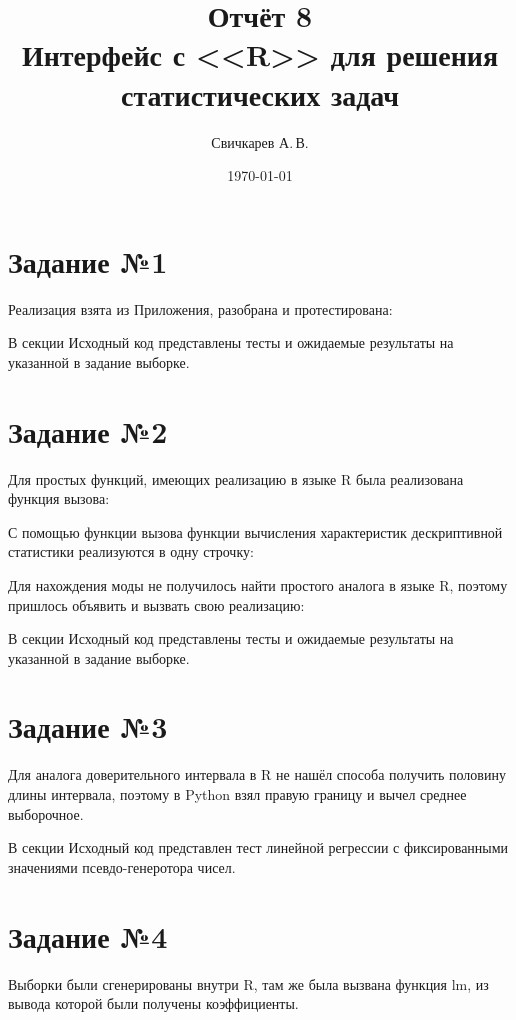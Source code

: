 \documentclass{article} %
\title{Отчёт 8\protect\\Интерфейс с <<R>> для решения статистических задач} %
\author{Свичкарев А.\,В.} %
\date{\today} %
\begin{document}

\maketitle %

\section{Задание №1}
Реализация взята из Приложения, разобрана и протестирована:


В секции Исходный код представлены тесты и ожидаемые результаты на указанной в задание выборке.

\section{Задание №2}
Для простых функций, имеющих реализацию в языке R была реализована функция вызова:


С помощью функции вызова функции вычисления характеристик дескриптивной статистики реализуются в одну строчку:


Для нахождения моды не получилось найти простого аналога в языке R, поэтому пришлось объявить и вызвать свою реализацию:


В секции Исходный код представлены тесты и ожидаемые результаты на указанной в задание выборке.

\section{Задание №3}
Для аналога доверительного интервала в R не нашёл способа получить половину длины интервала, поэтому в Python взял правую границу и вычел среднее выборочное.



В секции Исходный код представлен тест линейной регрессии с фиксированными значениями псевдо-генеротора чисел.

\section{Задание №4}
Выборки были сгенерированы внутри R, там же была вызвана функция lm, из вывода которой были получены коэффициенты.
\newpage

\end{document}
